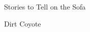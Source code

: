 \documentclass[11pt]{memoir}
\begin{document}
  \frontmatter
  \pagestyle{empty}


  \begin{flushright}
  \null
  \vfill
  \large{}
  \vfill
  \end{flushright}

  \cleardoublepage
  \doublespacing

  \begin{center}
    \TitleFamily
    \Huge{Stories to Tell on the Sofa}
    
    \vfill
  
    Dirt Coyote
  \end{center}
  \thispagestyle{empty}

  \newpage

  

  \cleardoublepage
  \tableofcontents*
  \newpage
  \null
  \cleardoublepage
  \mainmatter
  \doublespacing
  \pagestyle{ourbook}

  
\end{document}
